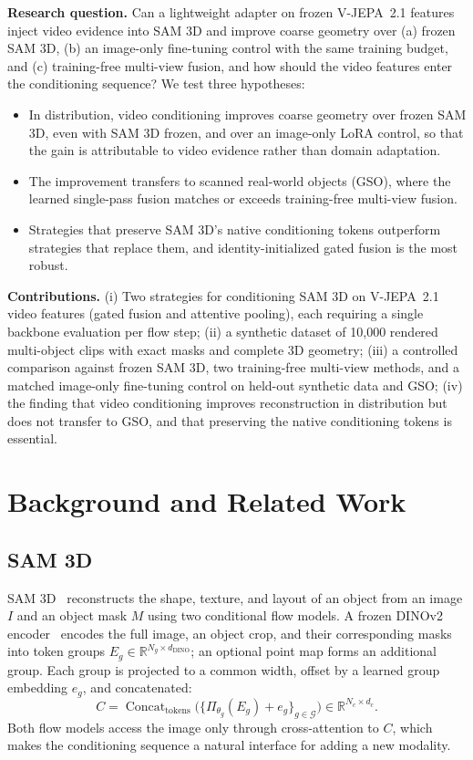 \documentclass{article}
\begin{document}
\textbf{Research question.} Can a lightweight adapter on frozen V-JEPA~2.1 features inject video evidence into SAM 3D and improve coarse geometry over (a) frozen SAM 3D, (b) an image-only fine-tuning control with the same training budget, and (c) training-free multi-view fusion, and how should the video features enter the conditioning sequence? We test three hypotheses:
\begin{itemize}
  \item[\textbf{H1}] In distribution, video conditioning improves coarse geometry over frozen SAM 3D, even with SAM 3D frozen, and over an image-only LoRA control, so that the gain is attributable to video evidence rather than domain adaptation.
  \item[\textbf{H2}] The improvement transfers to scanned real-world objects (GSO), where the learned single-pass fusion matches or exceeds training-free multi-view fusion.
  \item[\textbf{H3}] Strategies that preserve SAM 3D's native conditioning tokens outperform strategies that replace them, and identity-initialized gated fusion is the most robust.
\end{itemize}

\textbf{Contributions.} (i) Two strategies for conditioning SAM 3D on V-JEPA~2.1 video features (gated fusion and attentive pooling), each requiring a single backbone evaluation per flow step; (ii) a synthetic dataset of 10,000 rendered multi-object clips with exact masks and complete 3D geometry; (iii) a controlled comparison against frozen SAM 3D, two training-free multi-view methods, and a matched image-only fine-tuning control on held-out synthetic data and GSO; (iv) the finding that video conditioning improves reconstruction in distribution but does not transfer to GSO, and that preserving the native conditioning tokens is essential.

\section{Background and Related Work}

\subsection{SAM 3D}\label{sec:sam3d}
SAM 3D~\cite{sam3d} reconstructs the shape, texture, and layout of an object from an image $I$ and an object mask $M$ using two conditional flow models. A frozen DINOv2 encoder~\cite{dinov2} encodes the full image, an object crop, and their corresponding masks into token groups $E_g\in\mathbb{R}^{N_g\times d_{\mathrm{DINO}}}$; an optional point map forms an additional group. Each group is projected to a common width, offset by a learned group embedding $e_g$, and concatenated:
\begin{equation}
C=\operatorname{Concat}_{\mathrm{tokens}}\!\big(\{\Pi_{\theta_g}(E_g)+e_g\}_{g\in\mathcal{G}}\big)\in\mathbb{R}^{N_c\times d_c}.
\label{eq:cond}
\end{equation}
Both flow models access the image only through cross-attention to $C$, which makes the conditioning sequence a natural interface for adding a new modality.
\end{document}
